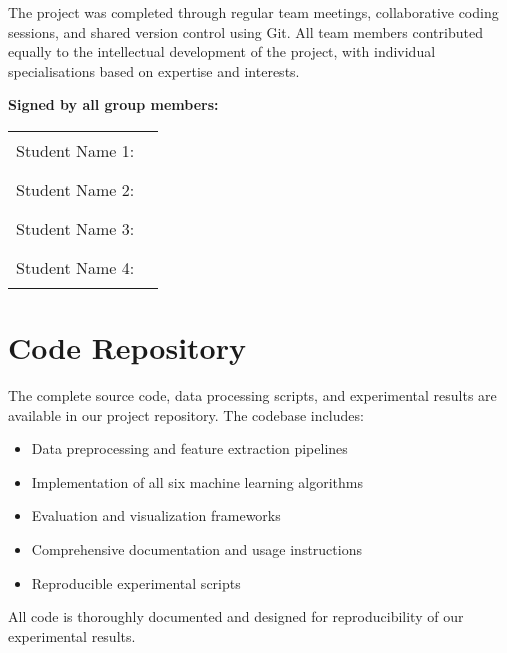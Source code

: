 \documentclass[11pt,a4paper]{article}
\begin{document}
The project was completed through regular team meetings, collaborative coding sessions, and shared version control using Git. All team members contributed equally to the intellectual development of the project, with individual specialisations based on expertise and interests.

\textbf{Signed by all group members:}

\vspace{1cm}

\begin{tabular}{ll}
    Student Name 1: & \rule{6cm}{0.4pt} \\[1cm]
    Student Name 2: & \rule{6cm}{0.4pt} \\[1cm]
    Student Name 3: & \rule{6cm}{0.4pt} \\[1cm]
    Student Name 4: & \rule{6cm}{0.4pt} \\
\end{tabular}

\section{Code Repository}

The complete source code, data processing scripts, and experimental results are available in our project repository. The codebase includes:

\begin{itemize}
    \item Data preprocessing and feature extraction pipelines
    \item Implementation of all six machine learning algorithms
    \item Evaluation and visualization frameworks
    \item Comprehensive documentation and usage instructions
    \item Reproducible experimental scripts
\end{itemize}

All code is thoroughly documented and designed for reproducibility of our experimental results.
\end{document}
